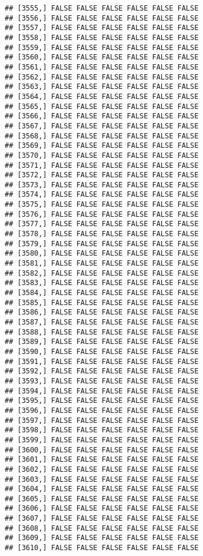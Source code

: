 \documentclass[
]{article}
\begin{document}
\begin{verbatim}
## [3555,] FALSE FALSE FALSE FALSE FALSE FALSE
## [3556,] FALSE FALSE FALSE FALSE FALSE FALSE
## [3557,] FALSE FALSE FALSE FALSE FALSE FALSE
## [3558,] FALSE FALSE FALSE FALSE FALSE FALSE
## [3559,] FALSE FALSE FALSE FALSE FALSE FALSE
## [3560,] FALSE FALSE FALSE FALSE FALSE FALSE
## [3561,] FALSE FALSE FALSE FALSE FALSE FALSE
## [3562,] FALSE FALSE FALSE FALSE FALSE FALSE
## [3563,] FALSE FALSE FALSE FALSE FALSE FALSE
## [3564,] FALSE FALSE FALSE FALSE FALSE FALSE
## [3565,] FALSE FALSE FALSE FALSE FALSE FALSE
## [3566,] FALSE FALSE FALSE FALSE FALSE FALSE
## [3567,] FALSE FALSE FALSE FALSE FALSE FALSE
## [3568,] FALSE FALSE FALSE FALSE FALSE FALSE
## [3569,] FALSE FALSE FALSE FALSE FALSE FALSE
## [3570,] FALSE FALSE FALSE FALSE FALSE FALSE
## [3571,] FALSE FALSE FALSE FALSE FALSE FALSE
## [3572,] FALSE FALSE FALSE FALSE FALSE FALSE
## [3573,] FALSE FALSE FALSE FALSE FALSE FALSE
## [3574,] FALSE FALSE FALSE FALSE FALSE FALSE
## [3575,] FALSE FALSE FALSE FALSE FALSE FALSE
## [3576,] FALSE FALSE FALSE FALSE FALSE FALSE
## [3577,] FALSE FALSE FALSE FALSE FALSE FALSE
## [3578,] FALSE FALSE FALSE FALSE FALSE FALSE
## [3579,] FALSE FALSE FALSE FALSE FALSE FALSE
## [3580,] FALSE FALSE FALSE FALSE FALSE FALSE
## [3581,] FALSE FALSE FALSE FALSE FALSE FALSE
## [3582,] FALSE FALSE FALSE FALSE FALSE FALSE
## [3583,] FALSE FALSE FALSE FALSE FALSE FALSE
## [3584,] FALSE FALSE FALSE FALSE FALSE FALSE
## [3585,] FALSE FALSE FALSE FALSE FALSE FALSE
## [3586,] FALSE FALSE FALSE FALSE FALSE FALSE
## [3587,] FALSE FALSE FALSE FALSE FALSE FALSE
## [3588,] FALSE FALSE FALSE FALSE FALSE FALSE
## [3589,] FALSE FALSE FALSE FALSE FALSE FALSE
## [3590,] FALSE FALSE FALSE FALSE FALSE FALSE
## [3591,] FALSE FALSE FALSE FALSE FALSE FALSE
## [3592,] FALSE FALSE FALSE FALSE FALSE FALSE
## [3593,] FALSE FALSE FALSE FALSE FALSE FALSE
## [3594,] FALSE FALSE FALSE FALSE FALSE FALSE
## [3595,] FALSE FALSE FALSE FALSE FALSE FALSE
## [3596,] FALSE FALSE FALSE FALSE FALSE FALSE
## [3597,] FALSE FALSE FALSE FALSE FALSE FALSE
## [3598,] FALSE FALSE FALSE FALSE FALSE FALSE
## [3599,] FALSE FALSE FALSE FALSE FALSE FALSE
## [3600,] FALSE FALSE FALSE FALSE FALSE FALSE
## [3601,] FALSE FALSE FALSE FALSE FALSE FALSE
## [3602,] FALSE FALSE FALSE FALSE FALSE FALSE
## [3603,] FALSE FALSE FALSE FALSE FALSE FALSE
## [3604,] FALSE FALSE FALSE FALSE FALSE FALSE
## [3605,] FALSE FALSE FALSE FALSE FALSE FALSE
## [3606,] FALSE FALSE FALSE FALSE FALSE FALSE
## [3607,] FALSE FALSE FALSE FALSE FALSE FALSE
## [3608,] FALSE FALSE FALSE FALSE FALSE FALSE
## [3609,] FALSE FALSE FALSE FALSE FALSE FALSE
## [3610,] FALSE FALSE FALSE FALSE FALSE FALSE

\end{verbatim}
\end{document}
